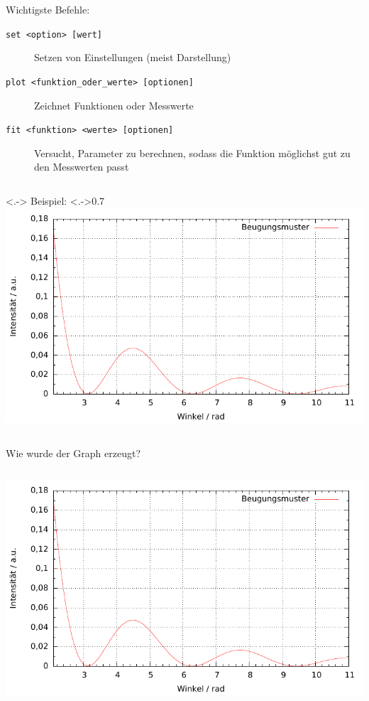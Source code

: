 \begin{frame}[<+->]
	Wichtigste Befehle:
	\begin{description}
		\item[\texttt{set <option> [wert]}] Setzen von Einstellungen (meist Darstellung)
		\item[\texttt{plot <funktion\_oder\_werte> [optionen]}] Zeichnet Funktionen oder Messwerte
		\item[\texttt{fit <funktion> <werte> [optionen]}] Versucht, Parameter zu berechnen, sodass die Funktion möglichst gut zu den Messwerten passt
	\end{description}

	\begin{columns}<.->
		Beispiel:
		\column<.->{0.7\textwidth}
		\includegraphics[width=\textwidth]{res/beispiel.pdf}
	\end{columns}
\end{frame}

\begin{frame}[<+->]
	Wie wurde der Graph erzeugt?

	\lstset{frame=L, numbers=left, xleftmargin=0.6cm}
	\begin{columns}
		
		\hspace*{-2.2cm}
		\includegraphics[width=1.6\textwidth]{res/beispiel.pdf}
		\vspace*{-2cm}
	\end{columns}
\end{frame}

